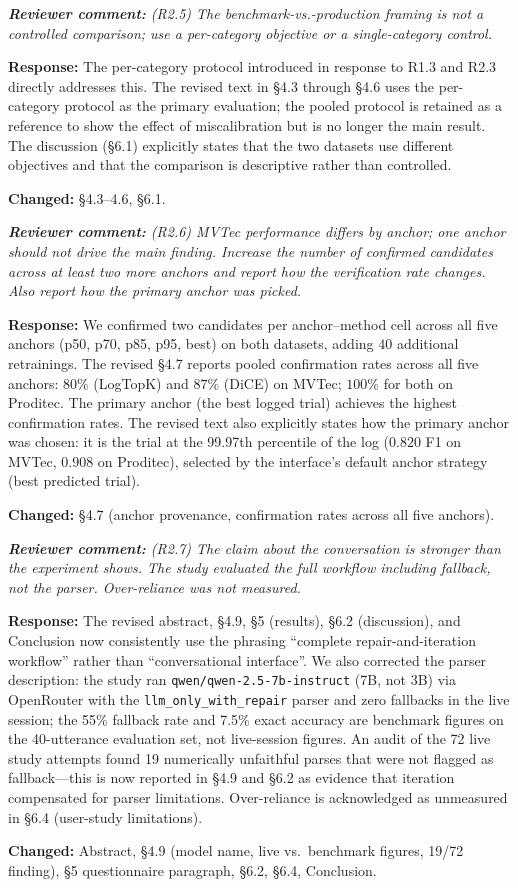 \documentclass[11pt,a4paper]{article}
\newcommand{\revquote}[1]{\smallskip\noindent\textit{\textbf{Reviewer comment:} #1}\smallskip}
\newcommand{\response}[1]{\noindent\textbf{Response:} #1\par}
\begin{document}
\bigskip

\revquote{(R2.5) The benchmark-vs.-production framing is not a controlled
comparison; use a per-category objective or a single-category control.}

\response{The per-category protocol introduced in response to R1.3 and
R2.3 directly addresses this. The revised text in \S4.3 through \S4.6
uses the per-category protocol as the primary evaluation; the pooled
protocol is retained as a reference to show the effect of miscalibration
but is no longer the main result. The discussion (\S6.1) explicitly
states that the two datasets use different objectives and that the
comparison is descriptive rather than controlled.

\noindent\textbf{Changed:} \S4.3--4.6, \S6.1.}

\bigskip

\revquote{(R2.6) MVTec performance differs by anchor; one anchor should not
drive the main finding. Increase the number of confirmed candidates
across at least two more anchors and report how the verification rate
changes. Also report how the primary anchor was picked.}

\response{We confirmed two candidates per anchor--method cell across all
five anchors (p50, p70, p85, p95, best) on both datasets, adding
$40$ additional retrainings. The revised \S4.7 reports pooled
confirmation rates across all five anchors: $80\%$ (LogTopK) and $87\%$
(DiCE) on MVTec; $100\%$ for both on Proditec. The primary anchor (the
best logged trial) achieves the highest confirmation rates. The revised
text also explicitly states how the primary anchor was chosen: it is
the trial at the 99.97th percentile of the log ($0.820$ F1 on MVTec,
$0.908$ on Proditec), selected by the interface's default anchor
strategy (best predicted trial).

\noindent\textbf{Changed:} \S4.7 (anchor provenance, confirmation rates
across all five anchors).}

\bigskip

\revquote{(R2.7) The claim about the conversation is stronger than the
experiment shows. The study evaluated the full workflow including
fallback, not the parser. Over-reliance was not measured.}

\response{The revised abstract, \S4.9, \S5 (results), \S6.2
(discussion), and Conclusion now consistently use the phrasing
``complete repair-and-iteration workflow'' rather than ``conversational
interface''. We also corrected the parser description: the study ran
\texttt{qwen/qwen-2.5-7b-instruct} (7B, not 3B) via OpenRouter with the
\texttt{llm\_only\_with\_repair} parser and zero fallbacks in the live
session; the 55\% fallback rate and 7.5\% exact accuracy are
benchmark figures on the 40-utterance evaluation set, not live-session
figures. An audit of the 72 live study attempts found 19 numerically
unfaithful parses that were not flagged as fallback---this is now
reported in \S4.9 and \S6.2 as evidence that iteration compensated for
parser limitations. Over-reliance is acknowledged as unmeasured in
\S6.4 (user-study limitations).

\noindent\textbf{Changed:} Abstract, \S4.9 (model name, live vs.\
benchmark figures, 19/72 finding), \S5 questionnaire paragraph,
\S6.2, \S6.4, Conclusion.}
\end{document}

